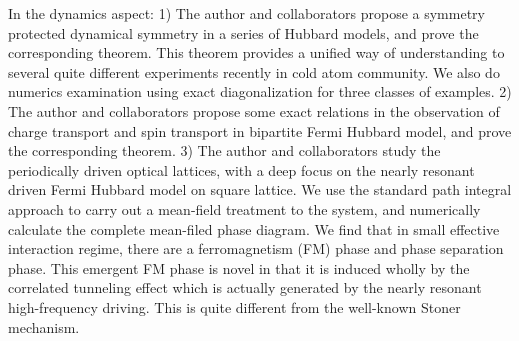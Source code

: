 \begin{eabstract}
In the dynamics aspect:
1) The author and collaborators propose a symmetry protected dynamical symmetry in a series of Hubbard models, and prove the corresponding theorem. This theorem provides a unified way of understanding to several quite different experiments recently in cold atom community. We also do numerics examination using exact diagonalization for three classes of examples.
2) The author and collaborators propose some exact relations in the observation of charge transport and spin transport in bipartite Fermi Hubbard model, and prove the corresponding theorem.
3) The author and collaborators study the periodically driven optical lattices, with a deep focus on the nearly resonant driven Fermi Hubbard model on square lattice. We use the standard path integral approach to carry out a mean-field treatment to the system, and numerically calculate the complete mean-filed phase diagram. We find that in small effective interaction regime, there are a ferromagnetism (FM) phase and phase separation phase. This emergent FM phase is novel in that it is induced wholly by the correlated tunneling effect which is actually generated by the nearly resonant high-frequency driving. This is quite different from the well-known Stoner mechanism. 
\end{eabstract}

